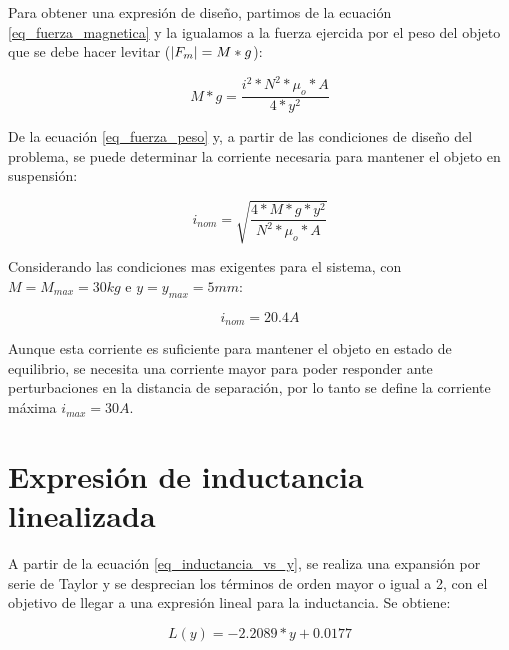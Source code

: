 

\noindent Para obtener una expresión de diseño, partimos de la ecuación \ref{eq_fuerza_magnetica} y la igualamos a la fuerza ejercida por el peso del objeto que se debe hacer levitar ($\lvert F_{m}\rvert=M*g$):

\begin{equation}\label{eq_fuerza_peso}
	M*g=\frac{i^{2}*N^{2}*\mu_{o}*A}{4*y^{2}}
\end{equation}

\noindent De la ecuación \ref{eq_fuerza_peso} y, a partir de las condiciones de diseño del problema, se puede determinar la corriente necesaria para mantener el objeto en suspensión:

\begin{equation} \label{eq_corriente_peso}
	i_{nom}=\sqrt{\frac{4*M*g*y^{2}}{N^{2}*\mu_{o}*A}}
\end{equation}

Considerando las condiciones mas exigentes para el sistema, con $M=M_{max}=30kg$ e $y=y_{max}=5mm$:

\begin{equation}
	i_{nom}=20.4A
\end{equation}

\noindent Aunque esta corriente es suficiente para mantener el objeto en estado de equilibrio, se necesita una corriente mayor para poder responder ante perturbaciones en la distancia de separación, por lo tanto se define la corriente máxima $i_{max}=30A$.



\section{Expresión de inductancia linealizada}

\noindent A partir de la ecuación \ref{eq_inductancia_vs_y}, se realiza una expansión por serie de Taylor y se desprecian los términos de orden mayor o igual a 2, con el objetivo de llegar a una expresión lineal para la inductancia. Se obtiene:

\begin{equation} \label{eq_inductancia_lineal_teorica}
	L(y)=-2.2089*y+0.0177
\end{equation}


